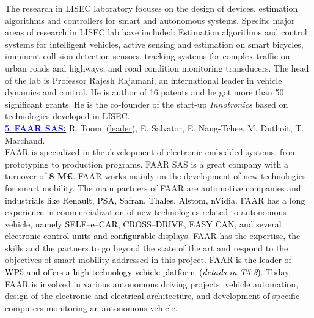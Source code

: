 \documentclass[a4paper,11pt]{article}
\begin{document}
%
The research in LISEC laboratory focuses on the design of devices, estimation algorithms and controllers for smart and autonomous systems. Specific major areas of research in LISEC lab have included: Estimation algorithms and control systems for intelligent vehicles, active sensing and estimation on smart bicycles, imminent collision detection sensors, tracking systems for complex traffic on urban roads and highways, and road condition monitoring transducers. The head of the lab is Professor Rajesh Rajamani, an international leader in vehicle dynamics and control. He is author of 16 patents and he got more than 50 significant grants. He is the co-founder of the start-up {\it Innotronics} based on technologies developed in LISEC.\\
%
%
\underline{\textcolor{blue}{5. \bf FAAR SAS:}} R. Toom~(\underline{leader}), E. Salvator, E. Nang-Tchee, M. Duthoit, T. Marchand.\\ 
%
FAAR is specialized in the development of electronic embedded systems, from prototyping to production programs. FAAR SAS is a great company with a turnover of {\bf 8 M\euro}. FAAR works mainly on the development of new technologies for smart mobility. The main partners of FAAR are automotive companies and industrials like \textcolor{black}{Renault, PSA, Safran, Thales, Alstom, nVidia}. FAAR has a long experience in commercialization of new technologies related to autonomous vehicle, namely \textcolor{black}{SELF--e--CAR, CROSS--DRIVE, EASY CAN, and several electronic control units and configurable displays}. FAAR has the expertise, the skills and the partners to go beyond the state of the art and respond to the objectives of smart mobility addressed in this project. \textcolor{black}{FAAR is the leader of WP5 and offers a high technology vehicle platform~({\it details in T5.3})}. Today, FAAR is involved in various autonomous driving projects: vehicle automation, design of the electronic and electrical architecture, and development of specific computers monitoring an autonomous vehicle.
\end{document}
